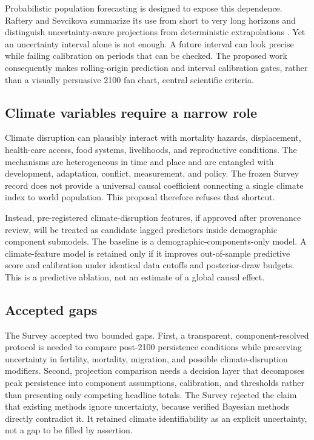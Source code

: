 \documentclass[conference]{IEEEtran}
\begin{document}
Probabilistic population forecasting is designed to expose this dependence. Raftery and Sevcikova summarize its use from short to very long horizons and distinguish uncertainty-aware projections from deterministic extrapolations \cite{raftery2023}. Yet an uncertainty interval alone is not enough. A future interval can look precise while failing calibration on periods that can be checked. The proposed work consequently makes rolling-origin prediction and interval calibration gates, rather than a visually persuasive 2100 fan chart, central scientific criteria.

\subsection{Climate variables require a narrow role}

Climate disruption can plausibly interact with mortality hazards, displacement, health-care access, food systems, livelihoods, and reproductive conditions. The mechanisms are heterogeneous in time and place and are entangled with development, adaptation, conflict, measurement, and policy. The frozen Survey record does not provide a universal causal coefficient connecting a single climate index to world population. This proposal therefore refuses that shortcut.

Instead, pre-registered climate-disruption features, if approved after provenance review, will be treated as candidate lagged predictors inside demographic component submodels. The baseline is a demographic-components-only model. A climate-feature model is retained only if it improves out-of-sample predictive score and calibration under identical data cutoffs and posterior-draw budgets. This is a predictive ablation, not an estimate of a global causal effect.

\subsection{Accepted gaps}

The Survey accepted two bounded gaps. First, a transparent, component-resolved protocol is needed to compare post-2100 persistence conditions while preserving uncertainty in fertility, mortality, migration, and possible climate-disruption modifiers. Second, projection comparison needs a decision layer that decomposes peak persistence into component assumptions, calibration, and thresholds rather than presenting only competing headline totals. The Survey rejected the claim that existing methods ignore uncertainty, because verified Bayesian methods directly contradict it. It retained climate identifiability as an explicit uncertainty, not a gap to be filled by assertion.
\end{document}
